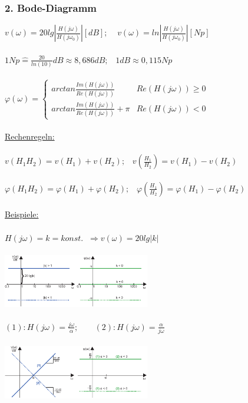 \documentclass[a4paper,twocolumn,10pt]{article}
\newcommand{\entspr}{\widehat{=}}
\begin{document}
\subsubsection*{2. Bode-Diagramm}
$v(\omega)=20lg\left|\frac{H(j\omega)}{H(j\omega_0)}\right| [dB];\;\;\;\;v(\omega)=ln\left|\frac{H(j\omega)}{H(j\omega_0)}\right| [Np]$\\\\
$1Np\entspr \frac{20}{ln(10)}dB\approx 8,686 dB;\;\;\;1dB\approx 0,115Np$\\\\
$\varphi(\omega)=\begin{cases}arctan\frac{Im(H(j\omega))}{Re(H(j\omega))} & Re(H(j\omega))\geq 0 \\arctan\frac{Im(H(j\omega))}{Re(H(j\omega))}+\pi & Re(H(j\omega))<0\end{cases}$\\\\
\underline{Rechenregeln:}\\\\
$v(H_1H_2)=v(H_1)+v(H_2);\;\;\;v(\frac{H_1}{H_2})=v(H_1)-v(H_2)$\\\\
$\varphi(H_1H_2)=\varphi(H_1)+\varphi(H_2);\;\;\;\varphi(\frac{H_1}{H_2})=\varphi(H_1)-\varphi(H_2)$\\\\
\underline{Beispiele:}\\\\
$H(j\omega)=k=konst.\;\;\Rightarrow v(\omega)=20lg|k|$\\\\
\includegraphics[width=0.48\textwidth]{img/Bode-Diagramm1}\\\\
$(1): H(j\omega)=\frac{j\omega}{\alpha};\;\;\;\;\;\;\;(2): H(j\omega)=\frac{\alpha}{j\omega}$\\\\
\includegraphics[width=0.48\textwidth]{img/Bode-Diagramm2}\\\\
\end{document}
